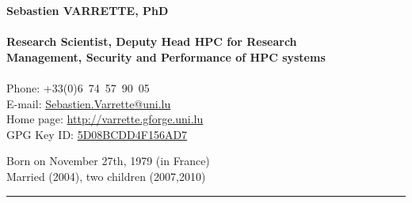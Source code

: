 \documentclass{cv}
\begin{document}
\begin{chapeau}
  \begin{adresse}
    {\Large\textbf{Sebastien VARRETTE, PhD}}\\
    \ligne\\
    \textbf{Research Scientist, Deputy Head HPC for Research}\\
    \textbf{Management, Security and Performance of HPC systems}\\
    \ligne\\
    Phone: +33(0)6~74~57~90~05\\
    E-mail:    \url{Sebastien.Varrette@uni.lu}\\
    Home page: \url{http://varrette.gforge.uni.lu}\\
    GPG Key ID: \href{https://pgp.mit.edu/pks/lookup?op=vindex&search=0x5D08BCDD4F156AD7}{5D08BCDD4F156AD7}
  \end{adresse}
  \begin{etatcivil}

    Born on November 27th, 1979 (in France)\\
    Married (2004), two children (2007,2010)\\
  \end{etatcivil}
\end{chapeau}
\vspace*{0.5em}
\noindent\rule{\textwidth}{0.4pt}
\end{document}
